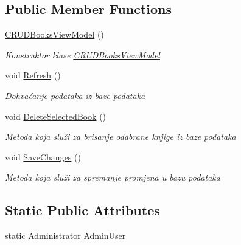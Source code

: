 \subsection*{Public Member Functions}
\begin{DoxyCompactItemize}
\item 
\mbox{\hyperlink{class_easy_library_application_1_1_w_p_f_1_1_view_model_1_1_c_r_u_d_books_view_model_a61e6410ce41a5c34a57d3d11542155b5}{C\+R\+U\+D\+Books\+View\+Model}} ()
\begin{DoxyCompactList}\small\item\em Konstruktor klase \mbox{\hyperlink{class_easy_library_application_1_1_w_p_f_1_1_view_model_1_1_c_r_u_d_books_view_model}{C\+R\+U\+D\+Books\+View\+Model}} \end{DoxyCompactList}\item 
void \mbox{\hyperlink{class_easy_library_application_1_1_w_p_f_1_1_view_model_1_1_c_r_u_d_books_view_model_a42ae20600107e5109d1c7318ab96e27d}{Refresh}} ()
\begin{DoxyCompactList}\small\item\em Dohvaćanje podataka iz baze podataka \end{DoxyCompactList}\item 
void \mbox{\hyperlink{class_easy_library_application_1_1_w_p_f_1_1_view_model_1_1_c_r_u_d_books_view_model_ae15f65e7f5577b87b83004624ac43485}{Delete\+Selected\+Book}} ()
\begin{DoxyCompactList}\small\item\em Metoda koja služi za brisanje odabrane knjige iz baze podataka \end{DoxyCompactList}\item 
void \mbox{\hyperlink{class_easy_library_application_1_1_w_p_f_1_1_view_model_1_1_c_r_u_d_books_view_model_afd845d1026b4773d9c5f466899bef23f}{Save\+Changes}} ()
\begin{DoxyCompactList}\small\item\em Metoda koja služi za spremanje promjena u bazu podataka \end{DoxyCompactList}\end{DoxyCompactItemize}
\subsection*{Static Public Attributes}
\begin{DoxyCompactItemize}
\item 
static \mbox{\hyperlink{class_easy_library_application_1_1_w_p_f_1_1_model_1_1_administrator}{Administrator}} \mbox{\hyperlink{class_easy_library_application_1_1_w_p_f_1_1_view_model_1_1_c_r_u_d_books_view_model_ae5442ddb916fbfd7b3a3baea9961feab}{Admin\+User}}
\end{DoxyCompactItemize}
